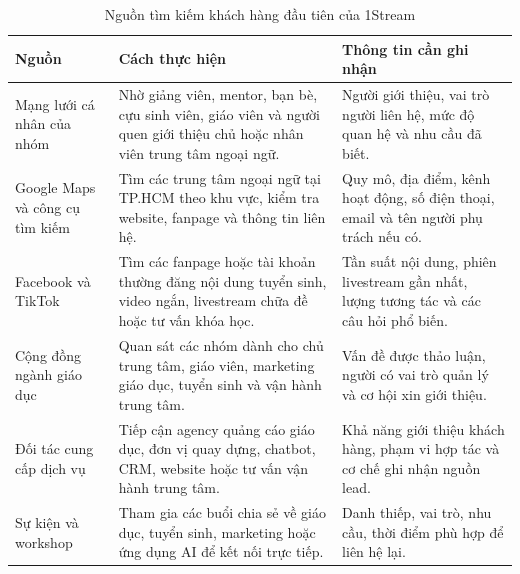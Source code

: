 \begin{table}[htbp]
    \centering
    \caption{Nguồn tìm kiếm khách hàng đầu tiên của 1Stream}
    \label{tab:first-customer-sources}
    \begin{tabular}{
        p{}
        p{}
        p{}
    }
        \hline
        \textbf{Nguồn}
        & \textbf{Cách thực hiện}
        & \textbf{Thông tin cần ghi nhận} \\
        \hline

        Mạng lưới cá nhân của nhóm
        &
        Nhờ giảng viên, mentor, bạn bè, cựu sinh viên, giáo viên và người quen giới thiệu chủ hoặc nhân viên trung tâm ngoại ngữ.
        &
        Người giới thiệu, vai trò người liên hệ, mức độ quan hệ và nhu cầu đã biết. \\

        \hline

        Google Maps và công cụ tìm kiếm
        &
        Tìm các trung tâm ngoại ngữ tại TP.HCM theo khu vực, kiểm tra website, fanpage và thông tin liên hệ.
        &
        Quy mô, địa điểm, kênh hoạt động, số điện thoại, email và tên người phụ trách nếu có. \\

        \hline

        Facebook và TikTok
        &
        Tìm các fanpage hoặc tài khoản thường đăng nội dung tuyển sinh, video ngắn, livestream chữa đề hoặc tư vấn khóa học.
        &
        Tần suất nội dung, phiên livestream gần nhất, lượng tương tác và các câu hỏi phổ biến. \\

        \hline

        Cộng đồng ngành giáo dục
        &
        Quan sát các nhóm dành cho chủ trung tâm, giáo viên, marketing giáo dục, tuyển sinh và vận hành trung tâm.
        &
        Vấn đề được thảo luận, người có vai trò quản lý và cơ hội xin giới thiệu. \\

        \hline

        Đối tác cung cấp dịch vụ
        &
        Tiếp cận agency quảng cáo giáo dục, đơn vị quay dựng, chatbot, CRM, website hoặc tư vấn vận hành trung tâm.
        &
        Khả năng giới thiệu khách hàng, phạm vi hợp tác và cơ chế ghi nhận nguồn lead. \\

        \hline

        Sự kiện và workshop
        &
        Tham gia các buổi chia sẻ về giáo dục, tuyển sinh, marketing hoặc ứng dụng AI để kết nối trực tiếp.
        &
        Danh thiếp, vai trò, nhu cầu, thời điểm phù hợp để liên hệ lại. \\

        \hline
    \end{tabular}
\end{table}

